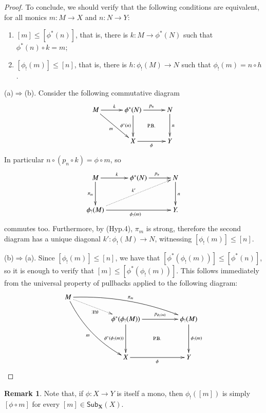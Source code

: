 \documentclass[12pt]{article}
\theoremstyle{definition}
\newtheorem{remark}[lemma]{Remark}
\numberwithin{equation}{section}
\newcommand{\catname}[1]{\mathbf{#1}}
\newcommand{\sub}[1]{\mathsf{Sub}_{\catname{#1}}}
\begin{document}
\begin{proof}
  To conclude, we should verify that the following conditions are equivalent, for all monics $m\colon M\to X$ and $n\colon N\to Y$:
	\begin{enumerate}[\rm (a)]
		\item $[m]\leq [\phi^*(n)]$, that is, there is $k\colon M\rightarrow \phi^*(N)$ such that $\phi^*(n)\circ k=m$;
		\item $[\phi_!(m)]\leq [n]$, that is, there is $h\colon \phi_!(M)\rightarrow N$ such that $\phi_!(m)=n\circ h$.
	\end{enumerate}
	\noindent
	(a)$\Rightarrow$(b). Consider the following commutative diagram
	\[
	\xymatrix@R=30pt@C=30pt{
		M\ar[rd]_m\ar[r]^k&\phi^*(N)\ar@{}[dr]|{\text{P.B.}}\ar[d]_{\phi^*(n)}\ar[r]^{p_n}&N\ar[d]^n\\
		&X\ar[r]_\phi&Y
	}
	\]
	In particular  $n\circ (p_{n}\circ k)=\phi\circ m$, so
	\[
	\xymatrix@R=30pt@C=30pt{
	M\ar[r]^k\ar[d]_{\pi_m}&\phi^*(N)\ar[r]^{p_n}&N\ar[d]^n\\
	\phi_!(M)\ar[rr]_{\phi_!(m)}\ar@{.>}[urr]^{k'}&&Y.
	}
	\]
	commutes too. Furthermore, by (Hyp.4), $\pi_m$ is strong, therefore the second diagram has a unique diagonal $k'\colon \phi_!(M)\to N$, witnessing $[\phi_!(m)]\leq [n]$.
	
	\smallskip\noindent
	(b)$\Rightarrow$(a). Since $[\phi_!(m)]\leq[n]$, we have that $[\phi^*(\phi_!(m))]\leq [\phi^*(n)]$, so it is enough to verify that $[m]\leq [\phi^*(\phi_!(m))]$. This follows immediately from the universal property of pullbacks applied to the following diagram:
	\belowdisplayskip=-14.5pt
	\[
	\xymatrix@C=50pt@R=17pt{
		M\ar@{.>}[dr]_{\exists! \theta}\ar@/_-10pt/[rrd]^{\pi_m}\ar@/_+10pt/[rddd]_{m}\\
		&\phi^*(\phi_!(M))\ar@{}[ddr]|{\text{P.B.}}\ar[r]^-{p_{\phi_!(m)}}\ar[dd]_{\phi^*(\phi_!(m))}&\phi_!(M)\ar[dd]^{\phi_!(m)}\\
		\\
		&X\ar[r]_\phi&Y
	}
	\]\qedhere
	\end{proof}

\begin{remark}\label{comp}
	Note that, if $\phi\colon X\to Y$ is itself a mono, then $\phi_!([m])$ is simply $[\phi\circ m]$ for every $[m]\in \sub{X}(X)$.
\end{remark}
\end{document}
